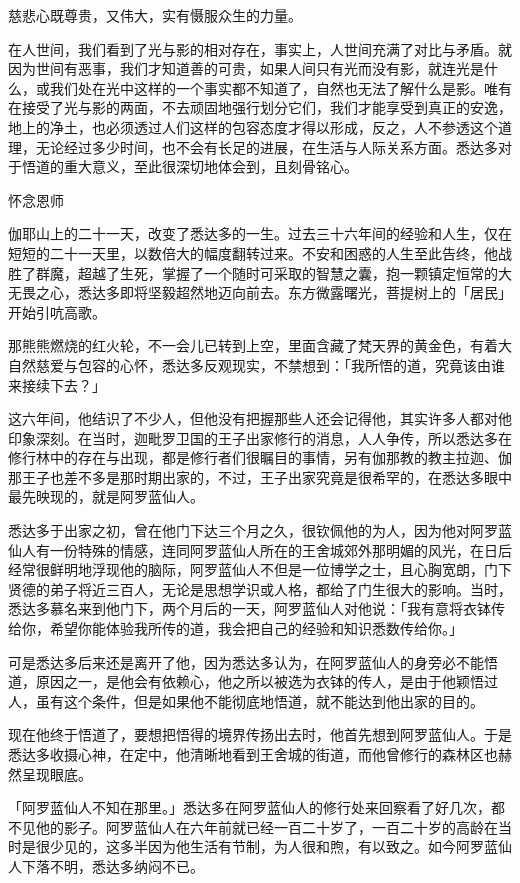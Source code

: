 \documentclass[12pt,twoside,openany]{book}
\begin{document}
慈悲心既尊贵，又伟大，实有慑服众生的力量。

在人世间，我们看到了光与影的相对存在，事实上，人世间充满了对比与矛盾。就因为世间有恶事，我们才知道善的可贵，如果人间只有光而没有影，就连光是什么，或我们处在光中这样的一个事实都不知道了，自然也无法了解什么是影。唯有在接受了光与影的两面，不去顽固地强行划分它们，我们才能享受到真正的安逸，地上的净土，也必须透过人们这样的包容态度才得以形成，反之，人不参透这个道理，无论经过多少时间，也不会有长足的进展，在生活与人际关系方面。悉达多对于悟道的重大意义，至此很深切地体会到，且刻骨铭心。

怀念恩师

伽耶山上的二十一天，改变了悉达多的一生。过去三十六年间的经验和人生，仅在短短的二十一天里，以数倍大的幅度翻转过来。不安和困惑的人生至此告终，他战胜了群魔，超越了生死，掌握了一个随时可采取的智慧之囊，抱一颗镇定恒常的大无畏之心，悉达多即将坚毅超然地迈向前去。东方微露曙光，菩提树上的「居民」开始引吭高歌。

那熊熊燃烧的红火轮，不一会儿已转到上空，里面含藏了梵天界的黄金色，有着大自然慈爱与包容的心怀，悉达多反观现实，不禁想到：「我所悟的道，究竟该由谁来接续下去？」

这六年间，他结识了不少人，但他没有把握那些人还会记得他，其实许多人都对他印象深刻。在当时，迦毗罗卫国的王子出家修行的消息，人人争传，所以悉达多在修行林中的存在与出现，都是修行者们很瞩目的事情，另有伽那教的教主拉迦、伽那王子也差不多是那时期出家的，不过，王子出家究竟是很希罕的，在悉达多眼中最先映现的，就是阿罗蓝仙人。

悉达多于出家之初，曾在他门下达三个月之久，很钦佩他的为人，因为他对阿罗蓝仙人有一份特殊的情感，连同阿罗蓝仙人所在的王舍城郊外那明媚的风光，在日后经常很鲜明地浮现他的脑际，阿罗蓝仙人不但是一位博学之士，且心胸宽朗，门下贤德的弟子将近三百人，无论是思想学识或人格，都给了门生很大的影响。当时，悉达多慕名来到他门下，两个月后的一天，阿罗蓝仙人对他说：「我有意将衣钵传给你，希望你能体验我所传的道，我会把自己的经验和知识悉数传给你。」

可是悉达多后来还是离开了他，因为悉达多认为，在阿罗蓝仙人的身旁必不能悟道，原因之一，是他会有依赖心，他之所以被选为衣钵的传人，是由于他颖悟过人，虽有这个条件，但是如果他不能彻底地悟道，就不能达到他出家的目的。

现在他终于悟道了，要想把悟得的境界传扬出去时，他首先想到阿罗蓝仙人。于是悉达多收摄心神，在定中，他清晰地看到王舍城的街道，而他曾修行的森林区也赫然呈现眼底。

「阿罗蓝仙人不知在那里。」悉达多在阿罗蓝仙人的修行处来回察看了好几次，都不见他的影子。阿罗蓝仙人在六年前就已经一百二十岁了，一百二十岁的高龄在当时是很少见的，这多半因为他生活有节制，为人很和煦，有以致之。如今阿罗蓝仙人下落不明，悉达多纳闷不已。
\end{document}
